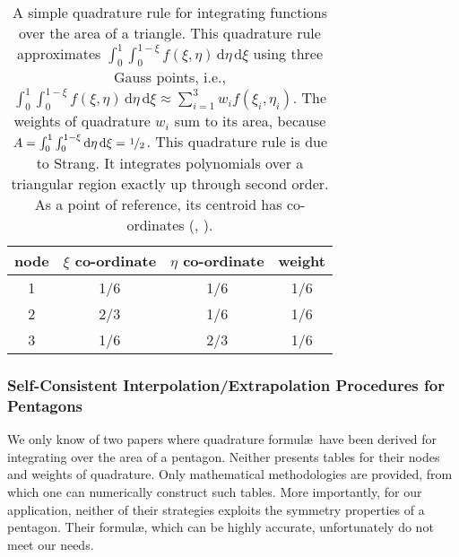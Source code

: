 \begin{table}
    \begin{center}
    \begin{tabular}{|c|ccc|}
        \hline
        node & $\xi$ co-ordinate & $\eta$ co-ordinate  & weight \\ \hline        
        1 & 1/6 & 1/6 & 1/6 \\ 
        2 & 2/3 & 1/6 & 1/6 \\ 
        3 & 1/6 & 2/3 & 1/6 \\ 
        \hline
    \end{tabular}
    \end{center}
    \caption{A simple quadrature rule for integrating functions over the area of a triangle.  This quadrature rule approximates $\int_0^1 \int_0^{1-\xi} f(\xi , \eta) \, \mathrm{d} \eta \, \mathrm{d} \xi$  using three Gauss points, i.e., $\int_0^1 \int_0^{1-\xi} f(\xi , \eta) \, \mathrm{d} \eta \, \mathrm{d} \xi \approx \sum_{i=1}^3 w_i f(\xi_i , \eta_i )$.  The weights of quadrature $w_i$ sum to its area, because $A = \int_0^1 \int_0^{1-\xi} \mathrm{d}\eta \, \mathrm{d} \xi = \textfrac{1}{2}$.  This quadrature rule is due to Strang.  It integrates polynomials over a triangular region exactly up through second order. As a point of reference, its centroid has co-ordinates (, ).}
    \label{tab:3nodeTriangle}
\end{table}
    
\subsubsection{Self-Consistent Interpolation\slash Extrapolation Procedures for Pentagons}
    \label{secPentagonGaussPts}
    
    We only know of two papers where quadrature formul\ae\ have been derived for integrating over the area of a pentagon. \cite{Mousavietal10,Chakrabortyetal18}  Neither presents tables for their nodes and weights of quadrature.  Only mathematical methodologies are provided, from which one can numerically construct such tables.  More importantly, for our application, neither of their strategies exploits the symmetry properties of a pentagon.  Their formul\ae, which can be highly accurate, unfortunately do not meet our needs. 
    
